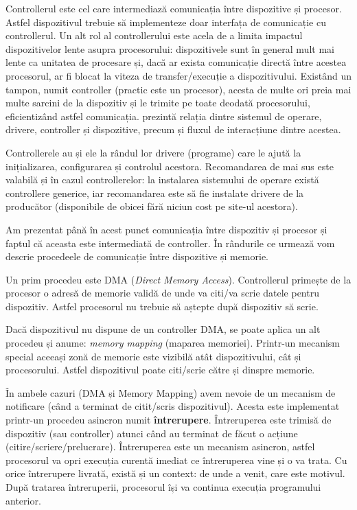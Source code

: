 Controllerul
este cel care intermediază comunicația între dispozitive și procesor. Astfel
dispozitivul trebuie să implementeze doar interfața de comunicație cu
controllerul. Un alt rol al controllerului este acela de a limita impactul
dispozitivelor lente asupra procesorului: dispozitivele sunt în general mult mai
lente ca unitatea de procesare și, dacă ar exista comunicație directă între
acestea procesorul, ar fi blocat la viteza de transfer/execuție a dispozitivului.
Existând un tampon, numit controller (practic este un procesor), acesta de multe
ori preia mai multe sarcini de la dispozitiv și le trimite pe toate deodată
procesorului, eficientizând astfel comunicația.  prezintă
relația dintre sistemul de operare, drivere, controller și dispozitive, precum
și fluxul de interacțiune dintre acestea.

Controllerele au și ele la rândul lor drivere (programe) care le ajută la
inițializarea, configurarea și controlul acestora. Recomandarea de mai sus este
valabilă și în cazul controllerelor: la instalarea sistemului de operare există
controllere generice, iar recomandarea este să fie instalate drivere de la
producător (disponibile de obicei fără niciun cost pe site-ul acestora).

Am prezentat până în acest punct comunicația între dispozitiv și procesor
și faptul că aceasta este intermediată de controller. În rândurile ce urmează
vom descrie procedeele de comunicație între dispozitive și memorie.

Un prim
procedeu este DMA  (\textit{Direct Memory
Access}). Controllerul primește de la procesor o adresă de memorie validă de
unde va citi/va scrie datele pentru dispozitiv. Astfel procesorul nu trebuie să
aștepte după dispozitiv să scrie.

Dacă dispozitivul nu dispune de un controller
DMA, se poate aplica un alt procedeu și anume: \textit{memory mapping} (maparea
memoriei). Printr-un mecanism special aceeași zonă de memorie este vizibilă atât
dispozitivului, cât și procesorului. Astfel dispozitivul poate citi/scrie către
și dinspre memorie.

În ambele cazuri (DMA și Memory Mapping) avem nevoie de un
mecanism de notificare (când a terminat de citit/scris dispozitivul). Acesta
este implementat printr-un procedeu asincron numit \textbf{întrerupere}.
Întreruperea este trimisă de dispozitiv (sau controller) atunci când au terminat
de făcut o acțiune (citire/scriere/prelucrare). Întreruperea este un mecanism
asincron, astfel procesorul va opri execuția curentă imediat ce întreruperea
vine și o va trata. Cu orice întrerupere livrată, există și un context: de unde
a venit, care este motivul. După tratarea întreruperii, procesorul își va
continua execuția programului anterior.

